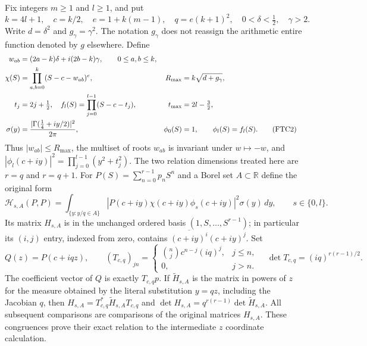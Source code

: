 \documentclass[11pt,a4paper]{article}
\begin{document}
Fix integers $m\ge1$ and $l\ge1$, and put
\begin{equation}
 k=4l+1,\quad c=k/2,\quad e=1+k(m-1),\quad q=e(k+1)^2,
 \quad 0<\delta<\tfrac12,\quad \gamma>2.
 \tag{FTC1}
\end{equation}
Write $d=\delta^2$ and $g_\gamma=\gamma^2$.  The notation $g_\gamma$
does not reassign the arithmetic entire function denoted by $g$ elsewhere.
Define
\begin{align}
 w_{ab}&=(2a-k)\delta+i(2b-k)\gamma,\qquad 0\le a,b\le k,\notag\\
 \chi(S)&=\prod_{a,b=0}^k(S-c-w_{ab})^e,
 &R_{\max}&=k\sqrt{d+g_\gamma},\notag\\
 t_j&=2j+\tfrac12,\quad
 f_l(S)=\prod_{j=0}^{l-1}(S-c-t_j),
 &t_{\max}&=2l-\tfrac32,\notag\\
 \sigma(y)&=\frac{|\Gamma(\tfrac14+iy/2)|^2}{2\pi},
 &\phi_0(S)&=1,\qquad \phi_l(S)=f_l(S).
 \tag{FTC2}
\end{align}
Thus $|w_{ab}|\le R_{\max}$, the multiset of roots $w_{ab}$ is invariant
under $w\mapsto-w$, and
$|\phi_l(c+iy)|^2=\prod_{j=0}^{l-1}(y^2+t_j^2)$.
The two relation dimensions treated here are $r=q$ and $r=q+1$.
For $P(S)=\sum_{n=0}^{r-1}p_nS^n$ and a Borel set $A\subset\mathbb R$
define the original form
\begin{equation}
 \mathcal H_{s,A}(P,P)=
 \int_{\{y:y/q\in A\}}
 |P(c+iy)\chi(c+iy)\phi_s(c+iy)|^2\sigma(y)\,dy,
 \qquad s\in\{0,l\}.
 \tag{FTC3}
\end{equation}
Its matrix $H_{s,A}$ is in the unchanged ordered basis
$(1,S,\ldots,S^{r-1})$; in particular its $(i,j)$ entry, indexed from zero,
contains $\overline{(c+iy)^i}(c+iy)^j$.  Set
\begin{equation}
 Q(z)=P(c+iqz),\qquad
 (T_{c,q})_{jn}=\begin{cases}
 \binom nj c^{n-j}(iq)^j,&j\le n,\\0,&j>n.
 \end{cases}
 \quad \det T_{c,q}=(iq)^{r(r-1)/2}.
 \tag{FTC4}
\end{equation}
The coefficient vector of $Q$ is exactly $T_{c,q}p$.  If $\widetilde H_{s,A}$
is the matrix in powers of $z$ for the measure obtained by the literal
substitution $y=qz$, including the Jacobian $q$, then
$H_{s,A}=T_{c,q}^*\widetilde H_{s,A}T_{c,q}$ and
$\det H_{s,A}=q^{r(r-1)}\det\widetilde H_{s,A}$.
All subsequent comparisons are comparisons of the original matrices
$H_{s,A}$.  These congruences prove their exact relation to the intermediate
$z$ coordinate calculation.
\end{document}
